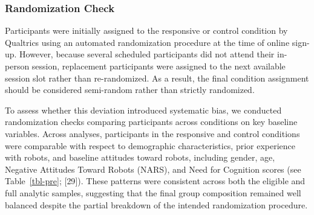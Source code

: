 \documentclass[
  letterpaper,
  DIV=11,
  numbers=noendperiod]{scrartcl}
\begin{document}
\subsubsection{Randomization Check}\label{randomization-check}

Participants were initially assigned to the responsive or control
condition by Qualtrics using an automated randomization procedure at the
time of online sign-up. However, because several scheduled participants
did not attend their in-person session, replacement participants were
assigned to the next available session slot rather than re-randomized.
As a result, the final condition assignment should be considered
semi-random rather than strictly randomized.

To assess whether this deviation introduced systematic bias, we
conducted randomization checks comparing participants across conditions
on key baseline variables. Across analyses, participants in the
responsive and control conditions were comparable with respect to
demographic characteristics, prior experience with robots, and baseline
attitudes toward robots, including gender, age, Negative Attitudes
Toward Robots (NARS), and Need for Cognition scores (see
Table~\ref{tbl-pre}; {[}29{]}). These patterns were consistent across
both the eligible and full analytic samples, suggesting that the final
group composition remained well balanced despite the partial breakdown
of the intended randomization procedure.
\end{document}
